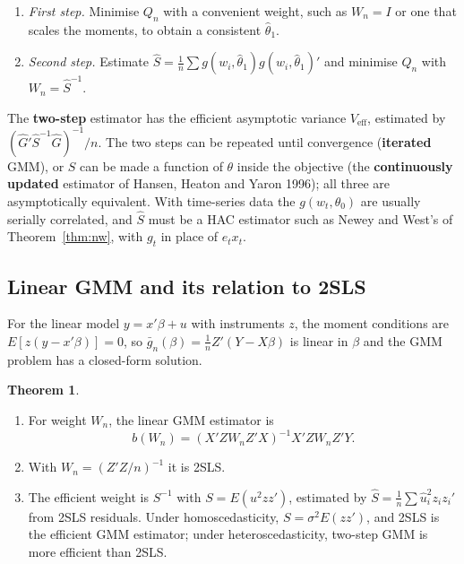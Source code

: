 \documentclass[11pt,a4paper]{article}
\numberwithin{equation}{section}
\theoremstyle{definition}
\newtheorem{thm}{Theorem}[subsection]
\begin{document}
\begin{enumerate}
\item \emph{First step.} Minimise $Q_n$ with a convenient weight, such as $W_n = I$ or one that scales the moments, to obtain a consistent $\hat\theta_1$.
\item \emph{Second step.} Estimate $\hat S = \frac1n\sum g(w_i, \hat\theta_1)g(w_i, \hat\theta_1)'$ and minimise $Q_n$ with $W_n = \hat S^{-1}$.
\end{enumerate}
The \textbf{two-step} estimator has the efficient asymptotic variance $V_{\text{eff}}$, estimated by $(\hat G'\hat S^{-1}\hat G)^{-1}/n$. The two steps can be repeated until convergence (\textbf{iterated}
GMM), or $S$ can be made a function of $\theta$ inside the objective (the \textbf{continuously updated} estimator of Hansen, Heaton and Yaron 1996); all three are
asymptotically equivalent. With time-series data the $g(w_t, \theta_0)$ are usually serially correlated, and $\hat S$ must be a HAC estimator such as Newey and West's
of Theorem~\ref{thm:nw}, with $g_t$ in place of $e_tx_t$.

\subsection{Linear GMM and its relation to 2SLS}
\label{ssec:lingmm}

For the linear model $y = x'\beta + u$ with instruments $z$, the moment conditions are $E[z(y - x'\beta)] = 0$, so $\bar g_n(\beta) = \frac1nZ'(Y - X\beta)$ is linear in $\beta$ and the GMM
problem has a closed-form solution.

\begin{thm}
\label{thm:lingmm}
\begin{enumerate}[label=(\roman*)]
\item For weight $W_n$, the linear GMM estimator is
\[
b(W_n) = (X'ZW_nZ'X)^{-1}X'ZW_nZ'Y .
\]
\item With $W_n = (Z'Z/n)^{-1}$ it is 2SLS.
\item The efficient weight is $S^{-1}$ with $S = E(u^2zz')$, estimated by $\hat S = \frac1n\sum\hat u_i^2z_iz_i'$ from 2SLS residuals. Under homoscedasticity, $S = \sigma^2E(zz')$, and 2SLS is
the efficient GMM estimator; under heteroscedasticity, two-step GMM is more efficient than 2SLS.
\end{enumerate}
\end{thm}
\end{document}
